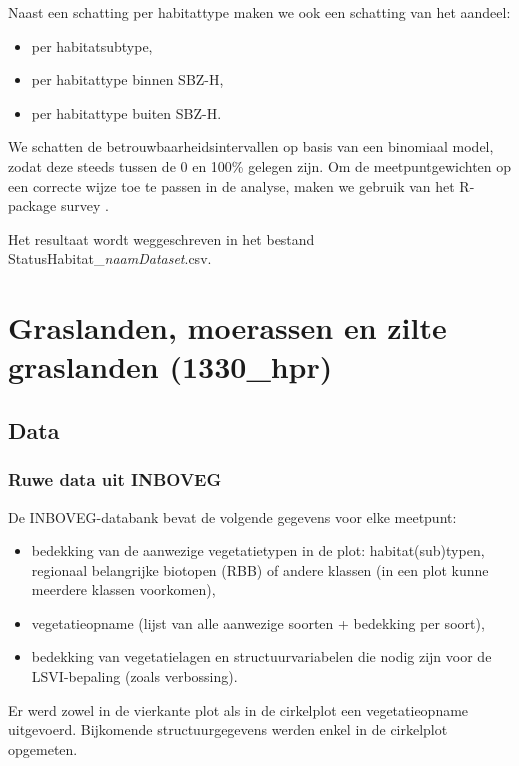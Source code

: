 \documentclass[twoside]{extreport}
\begin{document}
Naast een schatting per habitattype maken we ook een schatting van het
aandeel:

\begin{itemize}
\tightlist
\item
  per habitatsubtype,
\item
  per habitattype binnen SBZ-H,
\item
  per habitattype buiten SBZ-H.
\end{itemize}

We schatten de betrouwbaarheidsintervallen op basis van een binomiaal
model, zodat deze steeds tussen de 0 en 100\% gelegen zijn. Om de
meetpuntgewichten op een correcte wijze toe te passen in de analyse,
maken we gebruik van het R-package survey \citep{Lumley2019}.

Het resultaat wordt weggeschreven in het bestand
StatusHabitat\_\emph{naamDataset}.csv.

\chapter{Graslanden, moerassen en zilte graslanden
(1330\_hpr)}\label{h:GrasMoeras}

\section{Data}\label{data}

\subsection{Ruwe data uit INBOVEG}\label{ruwe-data-uit-inboveg}

De INBOVEG-databank bevat de volgende gegevens voor elke meetpunt:

\begin{itemize}
\item
  bedekking van de aanwezige vegetatietypen in de plot:
  habitat(sub)typen, regionaal belangrijke biotopen (RBB) of andere
  klassen (in een plot kunne meerdere klassen voorkomen),
\item
  vegetatieopname (lijst van alle aanwezige soorten + bedekking per
  soort),
\item
  bedekking van vegetatielagen en structuurvariabelen die nodig zijn
  voor de LSVI-bepaling (zoals verbossing).
\end{itemize}

Er werd zowel in de vierkante plot als in de cirkelplot een
vegetatieopname uitgevoerd. Bijkomende structuurgegevens werden enkel in
de cirkelplot opgemeten.
\end{document}

